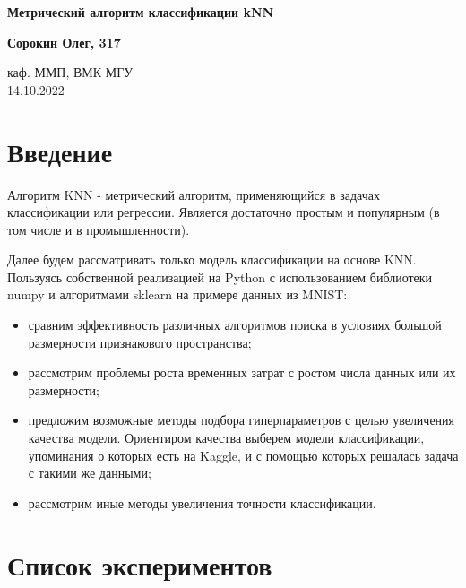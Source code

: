 \documentclass{article}
\begin{document}
\begin{titlepage}
    \begin{center}
        \vspace*{5cm}

        \LARGE
        \textbf{Метрический алгоритм классификации kNN}
    
        \vspace{0.5cm}
 
        \textbf{Сорокин Олег, 317}
 
        \vfill
             
        \vspace{0.8cm}
      
        \normalsize
        каф. ММП, ВМК МГУ\\
        14.10.2022
             
    \end{center}
 \end{titlepage}

\newpage
\tableofcontents{}
\newpage

\section{Введение}
    Алгоритм KNN - метрический алгоритм, применяющийся в задачах
    классификации или регрессии. Является достаточно
    простым и популярным (в том числе и в промышленности).

    Далее будем рассматривать только модель классификации на основе KNN.
    Пользуясь собственной реализацией на Python с использованием библиотеки numpy и алгоритмами sklearn на примере данных из MNIST:
    \begin{itemize}
        \item сравним эффективность различных алгоритмов поиска в условиях большой размерности
        признакового пространства;
        \item рассмотрим проблемы роста временных затрат с ростом числа данных
        или их размерности;
        \item предложим возможные методы подбора гиперпараметров с целью увеличения качества модели.
        Ориентиром качества выберем модели классификации, упоминания о которых
        есть на Kaggle, и с помощью которых решалась задача с такими же
        данными;
        \item рассмотрим иные методы увеличения точности классификации.
    \end{itemize}

\section{Список экспериментов}
\end{document}
